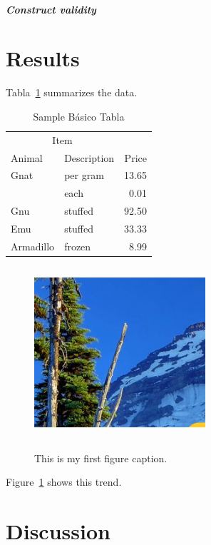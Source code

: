 \documentclass[stu]{apaV7}
\begin{document}
	\subparagraph{Construct validity}
	\lipsum[14]
	
	\section{Results}
	Tabla~\ref{tab:BasicTable} summarizes the data. \lipsum[15]
	
	\begin{table}
		\caption{Sample B\'asico Tabla}
		\label{tab:BasicTable}
		\begin{tabular}{@{}llr@{}}         \toprule
			\multicolumn{2}{c}{Item}        \\ \cmidrule(r){1-2}
			Animal    & Description & Price \\ \midrule
			Gnat      & per gram    & 13.65 \\
			& each        &  0.01 \\
			Gnu       & stuffed     & 92.50 \\
			Emu       & stuffed     & 33.33 \\
			Armadillo & frozen      &  8.99 \\ \bottomrule
		\end{tabular}
	\end{table}
	
	\begin{figure}
		\caption{This is my first figure caption.}
		\includegraphics[bb=0in 0in 2.5in 2.5in, height=2.5in, width=2.5in]{Figure1.png}
		\label{fig:Figure1}
	\end{figure}
	
	Figure~\ref{fig:Figure1} shows this trend. \lipsum[16]
	
	\section{Discussion}
	\lipsum[17]
	
	\printbibliography
\end{document}
